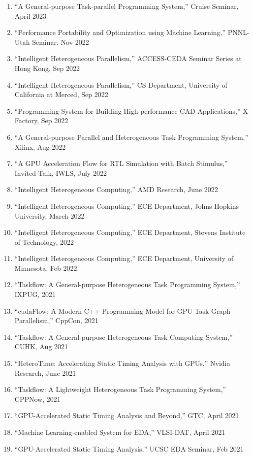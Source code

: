\documentclass[A4,11pt]{article}
\begin{document}
 \begin{enumerate}
 \itemsep-0.3em
  \item ``A General-purpose Task-parallel Programming System,'' Cruise Seminar, April 2023
  \item ``Performance Portability and Optimization using Machine Learning,'' PNNL-Utah Seminar, Nov 2022
  \item ``Intelligent Heterogeneous Parallelism,'' ACCESS-CEDA Seminar Series at Hong Kong, Sep 2022
  \item ``Intelligent Heterogeneous Parallelism,'' CS Department, University of California at Merced, Sep 2022
  \item ``Programming System for Building High-performance CAD Applications,'' X Factory, Sep 2022
  \item ``A General-purpose Parallel and Heterogeneous Task Programming System,'' Xilinx, Aug 2022
  \item ``A GPU Acceleration Flow for RTL Simulation with Batch Stimulus,'' Invited Talk, IWLS, July 2022
  \item ``Intelligent Heterogeneous Computing,'' AMD Research, June 2022
  \item ``Intelligent Heterogeneous Computing,'' ECE Department, Johns Hopkins University, March 2022
  \item ``Intelligent Heterogeneous Computing,'' ECE Department, Stevens Institute of Technology, 2022
  \item ``Intelligent Heterogeneous Computing,'' ECE Department, University of Minnesota, Feb 2022
  \item ``Taskflow: A General-purpose Heterogeneous Task Programming System,'' IXPUG, 2021
  \item ``cudaFlow: A Modern C++ Programming Model for GPU Task Graph Parallelism,'' CppCon, 2021
  \item ``Taskflow: A General-purpose Heterogeneous Task Computing System,'' CUHK, Aug 2021
  \item ``HeteroTime: Accelerating Static Timing Analysis with GPUs,'' Nvidia Research, June 2021
  \item ``Taskflow: A Lightweight Heterogeneous Task Programming System,'' CPPNow, 2021
  \item ``GPU-Accelerated Static Timing Analysis and Beyond,'' GTC, April 2021
  \item ``Machine Learning-enabled System for EDA,'' VLSI-DAT, April 2021
  \item ``GPU-Accelerated Static Timing Analysis,'' UCSC EDA Seminar, Feb 2021 

\end{enumerate}
\end{document}
